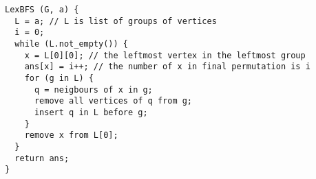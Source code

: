 \begin{verbatim}
LexBFS (G, a) {
  L = a; // L is list of groups of vertices
  i = 0;
  while (L.not_empty()) {
    x = L[0][0]; // the leftmost vertex in the leftmost group 
    ans[x] = i++; // the number of x in final permutation is i
    for (g in L) {
      q = neigbours of x in g;
      remove all vertices of q from g;
      insert q in L before g;
    }
    remove x from L[0];
  }
  return ans;
}
\end{verbatim}
